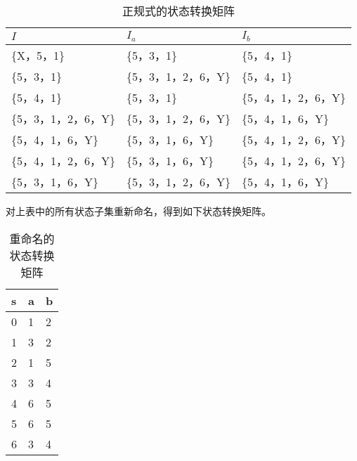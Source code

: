 \begin{table}[H]
    \centering
    \caption{正规式的状态转换矩阵}
    \label{table:正规式的状态转换矩阵}
    \setlength{\tabcolsep}{5mm}
    \begin{tabular}{l|ll}
        \toprule
        \textbf{$I$}         & \textbf{$I_a$}       & \textbf{$I_b$}       \\
        \midrule
        \{X，5，1\}          & \{5，3，1\}          & \{5，4，1\}          \\
        \{5，3，1\}          & \{5，3，1，2，6，Y\} & \{5，4，1\}          \\
        \{5，4，1\}          & \{5，3，1\}          & \{5，4，1，2，6，Y\} \\
        \{5，3，1，2，6，Y\} & \{5，3，1，2，6，Y\} & \{5，4，1，6，Y\}    \\
        \{5，4，1，6，Y\}    & \{5，3，1，6，Y\}    & \{5，4，1，2，6，Y\} \\
        \{5，4，1，2，6，Y\} & \{5，3，1，6，Y\}    & \{5，4，1，2，6，Y\} \\
        \{5，3，1，6，Y\}    & \{5，3，1，2，6，Y\} & \{5，4，1，6，Y\}    \\
        \bottomrule
    \end{tabular}
\end{table}

对上表中的所有状态子集重新命名，得到如下状态转换矩阵。

\begin{table}[H]
    \centering
    \caption{重命名的状态转换矩阵}
    \label{table:重命名的状态转换矩阵}
    \setlength{\tabcolsep}{15mm}
    \begin{tabular}{l|ll}
        \toprule
        \textbf{s} & \textbf{a} & \textbf{b} \\
        \midrule
        0          & 1          & 2          \\
        1          & 3          & 2          \\
        2          & 1          & 5          \\
        3          & 3          & 4          \\
        4          & 6          & 5          \\
        5          & 6          & 5          \\
        6          & 3          & 4          \\
        \bottomrule
    \end{tabular}
\end{table}

